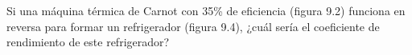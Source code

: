 \item Si una máquina térmica de Carnot con 35\% de eficiencia (figura 9.2) funciona en reversa para formar un refrigerador (figura 9.4), ¿cuál sería el coeficiente de rendimiento de este refrigerador?
